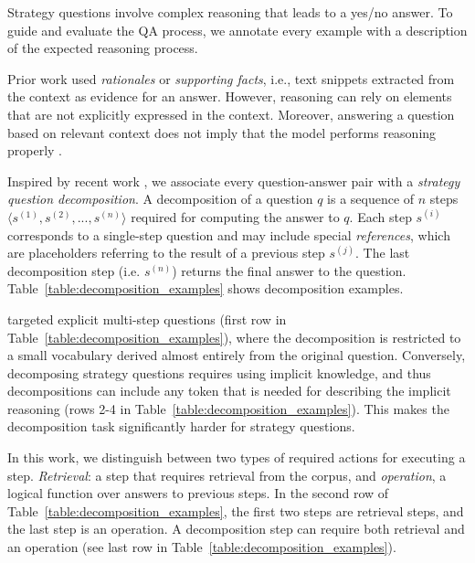 {Strategy questions involve complex reasoning that leads to a yes/no answer.
To guide and evaluate the QA process, we annotate every example with a description of the expected reasoning process. 

Prior work used \emph{rationales} or \emph{supporting facts}, i.e., text snippets extracted from the context \cite{deyoung2020eraser,yang2018hotpotqa, kwiatkowski2019natural,khot2020qasc} as evidence for an answer. 
However, reasoning can rely on elements that are not explicitly expressed in the context.
Moreover, answering a question based on relevant context does not imply that the model performs reasoning properly \cite{jiang2019avoiding}. 

Inspired by recent work \cite{wolfson2020break}, we associate every question-answer pair with a \emph{strategy question decomposition}.
A decomposition of a question $q$ is a sequence of $n$ steps $\langle s^{(1)}, s^{(2)}, ..., s^{(n)} \rangle$ required for computing the answer to $q$. 
Each step $s^{(i)}$ corresponds to a single-step question and may include special \emph{references}, which are placeholders referring to the result of a previous step $s^{(j)}$. The last decomposition step (i.e. $s^{(n)}$) returns the final answer to the question. Table~\ref{table:decomposition_examples} shows decomposition examples. 

 targeted explicit multi-step questions (first row in Table~\ref{table:decomposition_examples}), where the decomposition is restricted to a small vocabulary derived almost entirely from the original question.
Conversely, decomposing strategy questions requires using implicit knowledge, and thus decompositions can include any token that is needed for describing the implicit reasoning (rows 2-4 in Table~\ref{table:decomposition_examples}). This makes the decomposition task significantly harder for strategy questions.

In this work, we distinguish between two types of required actions for executing a step. \textit{Retrieval}: a step that requires retrieval from the corpus, and  \textit{operation}, a logical function over answers to previous steps. 
In the second row of Table~\ref{table:decomposition_examples}, the first two steps are retrieval steps, and the last step is an operation. 
A decomposition step can require both retrieval and an operation (see last row in Table~\ref{table:decomposition_examples}).

}
